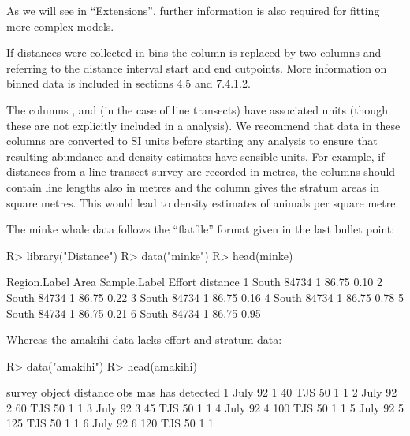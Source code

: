 \documentclass[article]{jss}\usepackage[]{graphicx}\usepackage[]{color}
\begin{document}
As we will see in ``Extensions'', further information is also required for fitting more complex models.

If distances were collected in bins the column  is replaced by two columns  and  referring to the distance interval start and end cutpoints. More information on binned data is included in \cite{Buckland:2001vm} sections 4.5 and 7.4.1.2.

The columns ,  and (in the case of line transects)  have associated units (though these are not explicitly included in a  analysis). We recommend that data in these columns are converted to SI units before starting any analysis to ensure that resulting abundance and density estimates have sensible units. For example, if distances from a line transect survey are recorded in metres, the  columns should contain line lengths also in metres and the  column gives the stratum areas in square metres. This would lead to density estimates of animals per square metre.

The minke whale data follows the ``flatfile'' format given in the last bullet point:
\begin{Schunk}
\begin{Sinput}
R> library("Distance")
R> data("minke")
R> head(minke)
\end{Sinput}
\begin{Soutput}
  Region.Label  Area Sample.Label Effort distance
1        South 84734            1  86.75     0.10
2        South 84734            1  86.75     0.22
3        South 84734            1  86.75     0.16
4        South 84734            1  86.75     0.78
5        South 84734            1  86.75     0.21
6        South 84734            1  86.75     0.95
\end{Soutput}
\end{Schunk}
Whereas the amakihi data lacks effort and stratum data:
\begin{Schunk}
\begin{Sinput}
R> data("amakihi")
R> head(amakihi)
\end{Sinput}
\begin{Soutput}
   survey object distance obs mas has detected
1 July 92      1       40 TJS  50   1        1
2 July 92      2       60 TJS  50   1        1
3 July 92      3       45 TJS  50   1        1
4 July 92      4      100 TJS  50   1        1
5 July 92      5      125 TJS  50   1        1
6 July 92      6      120 TJS  50   1        1
\end{Soutput}
\end{Schunk}
\end{document}
